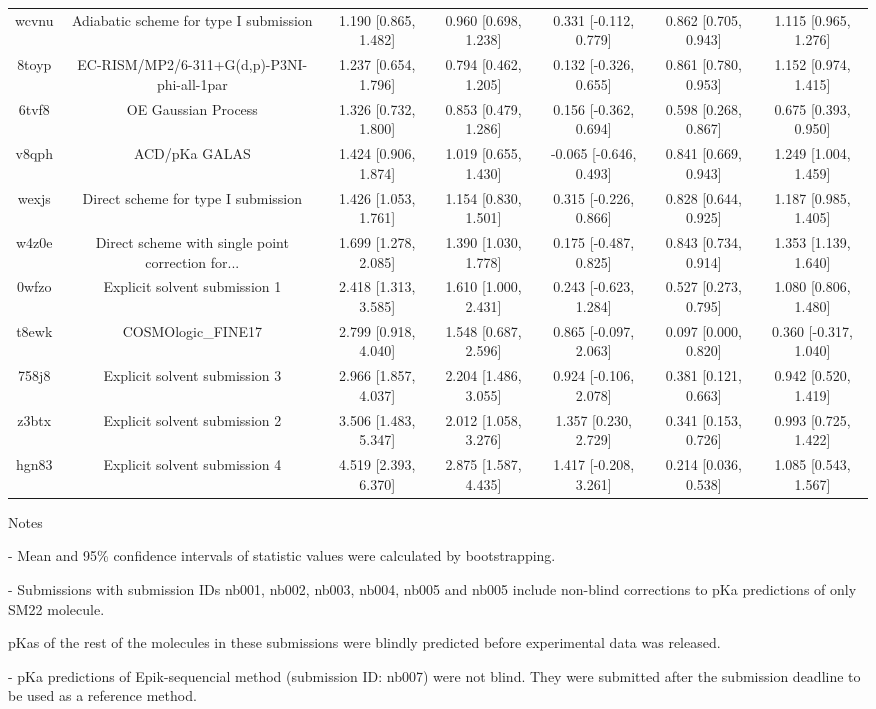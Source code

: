 \documentclass{article}
\begin{document}
\begin{center}
\begin{longtable}{|ccccccc|}
 wcvnu &             Adiabatic scheme for type I submission &  1.190 [0.865, 1.482] &  0.960 [0.698, 1.238] &    0.331 [-0.112, 0.779] &  0.862 [0.705, 0.943] &   1.115 [0.965, 1.276] \\
 8toyp &         EC-RISM/MP2/6-311+G(d,p)-P3NI-phi-all-1par &  1.237 [0.654, 1.796] &  0.794 [0.462, 1.205] &    0.132 [-0.326, 0.655] &  0.861 [0.780, 0.953] &   1.152 [0.974, 1.415] \\
 6tvf8 &                                OE Gaussian Process &  1.326 [0.732, 1.800] &  0.853 [0.479, 1.286] &    0.156 [-0.362, 0.694] &  0.598 [0.268, 0.867] &   0.675 [0.393, 0.950] \\
 v8qph &                                      ACD/pKa GALAS &  1.424 [0.906, 1.874] &  1.019 [0.655, 1.430] &   -0.065 [-0.646, 0.493] &  0.841 [0.669, 0.943] &   1.249 [1.004, 1.459] \\
 wexjs &                Direct scheme for type I submission &  1.426 [1.053, 1.761] &  1.154 [0.830, 1.501] &    0.315 [-0.226, 0.866] &  0.828 [0.644, 0.925] &   1.187 [0.985, 1.405] \\
 w4z0e &  Direct scheme with single point correction for... &  1.699 [1.278, 2.085] &  1.390 [1.030, 1.778] &    0.175 [-0.487, 0.825] &  0.843 [0.734, 0.914] &   1.353 [1.139, 1.640] \\
 0wfzo &                      Explicit solvent submission 1 &  2.418 [1.313, 3.585] &  1.610 [1.000, 2.431] &    0.243 [-0.623, 1.284] &  0.527 [0.273, 0.795] &   1.080 [0.806, 1.480] \\
 t8ewk &                                 COSMOlogic\_FINE17 &  2.799 [0.918, 4.040] &  1.548 [0.687, 2.596] &    0.865 [-0.097, 2.063] &  0.097 [0.000, 0.820] &  0.360 [-0.317, 1.040] \\
 758j8 &                      Explicit solvent submission 3 &  2.966 [1.857, 4.037] &  2.204 [1.486, 3.055] &    0.924 [-0.106, 2.078] &  0.381 [0.121, 0.663] &   0.942 [0.520, 1.419] \\
 z3btx &                      Explicit solvent submission 2 &  3.506 [1.483, 5.347] &  2.012 [1.058, 3.276] &     1.357 [0.230, 2.729] &  0.341 [0.153, 0.726] &   0.993 [0.725, 1.422] \\
 hgn83 &                      Explicit solvent submission 4 &  4.519 [2.393, 6.370] &  2.875 [1.587, 4.435] &    1.417 [-0.208, 3.261] &  0.214 [0.036, 0.538] &   1.085 [0.543, 1.567] \\
\end{longtable}
\end{center}

Notes

- Mean and 95\% confidence intervals of statistic values were calculated by bootstrapping.

- Submissions with submission IDs nb001, nb002, nb003, nb004, nb005 and nb005 include non-blind corrections to pKa predictions of only SM22 molecule.

pKas of the rest of the molecules in these submissions were blindly predicted before experimental data was released.

- pKa predictions of Epik-sequencial method (submission ID: nb007) were not blind. They were submitted after the submission deadline to be used as a reference method.
\end{document}
